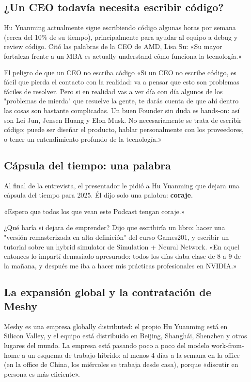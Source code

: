 \subsection{¿Un CEO todavía necesita escribir código?}

Hu Yuanming actualmente sigue escribiendo código algunas horas por semana (cerca del 10\% de su tiempo), principalmente para ayudar al equipo a debug y review código. Citó las palabras de la CEO de AMD, Lisa Su: «Su mayor fortaleza frente a un MBA es actually understand cómo funciona la tecnología.»

\begin{warningbox}{El peligro de que un CEO no escriba código}
«Si un CEO no escribe código, es fácil que pierda el contacto con la realidad: va a pensar que esto son problemas fáciles de resolver. Pero si en realidad vas a ver día con día algunos de los "problemas de mierda" que resuelve la gente, te darás cuenta de que ahí dentro las cosas son bastante complicadas. Un buen Founder sin duda es hands-on: así son Lei Jun, Jensen Huang y Elon Musk. No necesariamente se trata de escribir código; puede ser diseñar el producto, hablar personalmente con los proveedores, o tener un entendimiento profundo de la tecnología.»
\end{warningbox}

\subsection{Cápsula del tiempo: una palabra}

Al final de la entrevista, el presentador le pidió a Hu Yuanming que dejara una cápsula del tiempo para 2025. Él dijo solo una palabra: \textbf{coraje}.

«Espero que todos los que vean este Podcast tengan coraje.»

¿Qué haría si dejara de emprender? Dijo que escribiría un libro: hacer una "versión remasterizada en alta definición" del curso Games201, y escribir un tutorial sobre un hybrid simulator de Simulation + Neural Network. «En aquel entonces lo impartí demasiado apresurado: todos los días daba clase de 8 a 9 de la mañana, y después me iba a hacer mis prácticas profesionales en NVIDIA.»

\subsection{La expansión global y la contratación de Meshy}

Meshy es una empresa globally distributed: el propio Hu Yuanming está en Silicon Valley, y el equipo está distribuido en Beijing, Shanghái, Shenzhen y otros lugares del mundo. La empresa está pasando poco a poco del modelo work-from-home a un esquema de trabajo híbrido: al menos 4 días a la semana en la office (en la office de China, los miércoles se trabaja desde casa), porque «discutir en persona es más eficiente».

